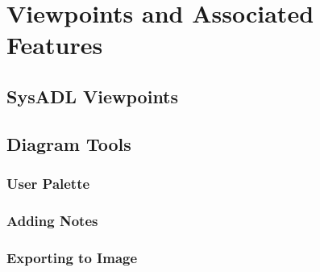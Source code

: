 \chapter{Viewpoints and Associated Features}

\section{SysADL Viewpoints}
\section{Diagram Tools}
\subsection{User Palette}
\subsection{Adding Notes}
\subsection{Exporting to Image}
